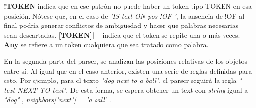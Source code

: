\textbf{!TOKEN} indica que en ese patr\'on no puede haber un token tipo TOKEN en esa posici\'on. N\'otese que, en el caso de \textit{'IS text ON pos !OF '}, la ausencia de !OF al final podría generar conflictos de ambigüedad y hacer que palabras necesarias sean descartadas. \textbf{[TOKEN]|+} indica que el token se repite una o m\'as veces. \textbf{Any} se refiere a un token cualquiera que sea tratado como palabra.

En la segunda parte del parser, se analizan las posiciones relativas de los objetos entre sí. Al igual que en el caso anterior, existen una serie de reglas definidas para esto. Por ejemplo, para el texto \textit{"dog next to a ball"}, el parser seguirá la regla \textit{" text NEXT TO text"}. De esta forma, se espera obtener un text con \textit{string} igual a \textit{ "dog" }, \textit{neighbors["next"] = 'a ball' }.


